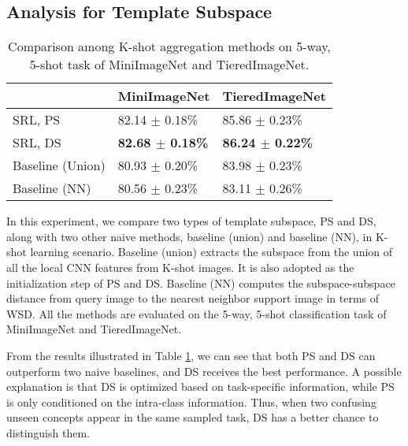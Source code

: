 \subsection{Analysis for Template Subspace}
\begin{table}[t]
\begin{tabular}{l|ll}
\hline
                 & MiniImageNet       & TieredImageNet     \\ \hline
SRL, PS               & 82.14 $\pm$ 0.18\% & 85.86 $\pm$ 0.23\% \\
SRL, DS               & \textbf{82.68 $\pm$ 0.18\%} & \textbf{86.24 $\pm$ 0.22\%} \\
Baseline (Union) & 80.93 $\pm$ 0.20\% & 83.98 $\pm$ 0.23\% \\
Baseline (NN)    & 80.56 $\pm$ 0.23\% & 83.11 $\pm$ 0.26\% \\ \hline
\end{tabular}
\caption{Comparison among K-shot aggregation methods on 5-way, 5-shot task of MiniImageNet and TieredImageNet.}
\label{tab:kshot}
\end{table}

In this experiment, we compare two types of template subspace, PS and DS, along with two other naive methods, baseline (union) and baseline (NN), in K-shot learning scenario.
Baseline (union) extracts the subspace from the union of all the local CNN features from K-shot images.
It is also adopted as the initialization step of PS and DS.
Baseline (NN) computes the subspace-subspace distance from query image to the nearest neighbor support image in terms of WSD.
All the methods are evaluated on the 5-way, 5-shot classification task of MiniImageNet and TieredImageNet.

From the results illustrated in Table \ref{tab:kshot}, we can see that both PS and DS can outperform two naive baselines, and DS receives the best performance.
A possible explanation is that DS is optimized based on task-specific information, while PS is only conditioned on the intra-class information. 
Thus, when two confusing unseen concepts appear in the same sampled task, DS has a better chance to distinguish them.

\iffalse. %
We also conduct a follow-up study trying to combine PS and DS.
To do so, we derive the template subspace $U_{temp}$ by optimizing the weighted summation of eq. (\ref{eq:subspace_proto}) and eq. (\ref{eq:subspace_disc}):
\begin{equation}
    U_{temp} = \arg\min_{U} L_{disc}(U) + \alpha L_{proto}(U)
\end{equation}
where $\alpha$ is the hyper-parameter controlling the balance between PS and DS objectives.
However, the result shows that the best accuracy of 5-way, 5-shot task on MiniImageNet only increases $0.1\%$ from SRL with DS.
Therefore, while compared with previous state-of-the-art, we choose DS as the template subspace for class-specific representation.
\fi %

